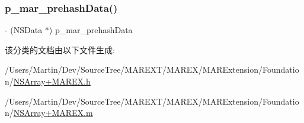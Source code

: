\subsubsection{\texorpdfstring{p\+\_\+mar\+\_\+prehash\+Data()}{p\_mar\_prehashData()}}
{\footnotesize\ttfamily -\/ (N\+S\+Data $\ast$) p\+\_\+mar\+\_\+prehash\+Data \begin{DoxyParamCaption}{ }\end{DoxyParamCaption}\hspace{0.3cm}{\ttfamily [implementation]}}



该分类的文档由以下文件生成\+:\begin{DoxyCompactItemize}
\item 
/\+Users/\+Martin/\+Dev/\+Source\+Tree/\+M\+A\+R\+E\+X\+T/\+M\+A\+R\+E\+X/\+M\+A\+R\+Extension/\+Foundation/\hyperlink{_n_s_array_09_m_a_r_e_x_8h}{N\+S\+Array+\+M\+A\+R\+E\+X.\+h}\item 
/\+Users/\+Martin/\+Dev/\+Source\+Tree/\+M\+A\+R\+E\+X\+T/\+M\+A\+R\+E\+X/\+M\+A\+R\+Extension/\+Foundation/\hyperlink{_n_s_array_09_m_a_r_e_x_8m}{N\+S\+Array+\+M\+A\+R\+E\+X.\+m}\end{DoxyCompactItemize}
